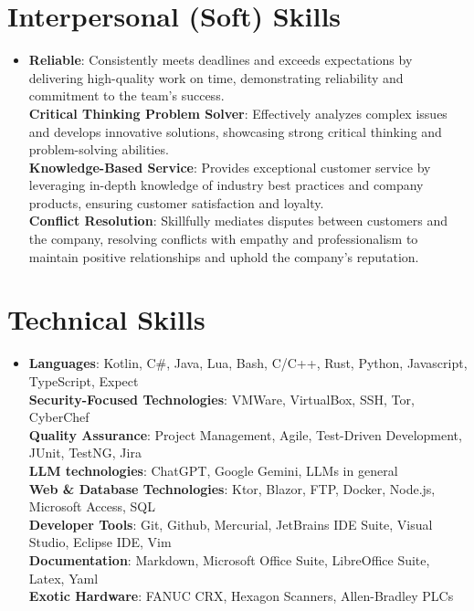 \documentclass[letterpaper,11pt]{article}
\begin{document}
\section{Interpersonal (Soft) Skills}
\begin{itemize}[leftmargin=0.15in, label={}]
  \item{
        \textbf{Reliable}{: Consistently meets deadlines and exceeds expectations by delivering high-quality work on time, demonstrating reliability and commitment to the team's success.} \\
        \textbf{Critical Thinking Problem Solver}{: Effectively analyzes complex issues and develops innovative solutions, showcasing strong critical thinking and problem-solving abilities.} \\
        \textbf{Knowledge-Based Service}{: Provides exceptional customer service by leveraging in-depth knowledge of industry best practices and company products, ensuring customer satisfaction and loyalty.} \\
        \textbf{Conflict Resolution}{: Skillfully mediates disputes between customers and the company, resolving conflicts with empathy and professionalism to maintain positive relationships and uphold the company's reputation.} \\

    }
\end{itemize}
\vspace{-10pt}



%
\section{Technical Skills}
\begin{itemize}[leftmargin=0.15in, label={}]
  \item{
        \textbf{Languages}{: Kotlin, C\#, Java, Lua, Bash, C/C++, Rust, Python, Javascript, TypeScript, Expect} \\
        \textbf{Security-Focused Technologies}{: VMWare, VirtualBox, SSH, Tor, CyberChef} \\
        \textbf{Quality Assurance}{: Project Management, Agile, Test-Driven Development, JUnit, TestNG, Jira } \\
        \textbf{LLM technologies}{: ChatGPT, Google Gemini, LLMs in general } \\
        \textbf{Web \& Database Technologies}{: Ktor, Blazor, FTP, Docker, Node.js, Microsoft Access, SQL} \\
        \textbf{Developer Tools}{: Git, Github, Mercurial, JetBrains IDE Suite, Visual Studio, Eclipse IDE, Vim} \\
        \textbf{Documentation}{: Markdown, Microsoft Office Suite, LibreOffice Suite, Latex, Yaml } \\
        \textbf{Exotic Hardware}{: FANUC CRX, Hexagon Scanners, Allen-Bradley PLCs} \\

        }
\end{itemize}
\vspace{-10pt}
\end{document}
